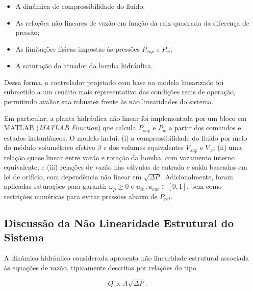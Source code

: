 \begin{itemize}
    \item A dinâmica de compressibilidade do fluido;
    \item As relações não lineares de vazão em função da raiz quadrada da diferença de pressão;
    \item As limitações físicas impostas às pressões $P_{sup}$ e $P_w$;
    \item A saturação do atuador da bomba hidráulica.
\end{itemize}

Dessa forma, o controlador projetado com base no modelo linearizado foi submetido a um cenário mais representativo das condições reais de operação, permitindo avaliar sua robustez frente às não linearidades do sistema.

Em particular, a planta hidráulica não linear foi implementada por um bloco em MATLAB (\textit{MATLAB Function}) que calcula $\dot{P}_{sup}$ e $\dot{P}_w$ a partir dos comandos e estados instantâneos. O modelo inclui: (i) a compressibilidade do fluido por meio do módulo volumétrico efetivo $\beta$ e dos volumes equivalentes $V_{sup}$ e $V_w$; (ii) uma relação quase linear entre vazão e rotação da bomba, com vazamento interno equivalente; e (iii) relações de vazão nas válvulas de entrada e saída baseadas em lei de orifício, com dependência não linear em $\sqrt{\Delta P}$. Adicionalmente, foram aplicadas saturações para garantir $\omega_p \ge 0$ e $u_{in},u_{out} \in [0,1]$, bem como restrições numéricas para evitar pressões abaixo de $P_{ret}$.

\subsection{Discussão da Não Linearidade Estrutural do Sistema}
\label{sec:discussao-nao-linearidade-estrutural}

A dinâmica hidráulica considerada apresenta não linearidade estrutural associada às equações de vazão, tipicamente descritas por relações do tipo

\begin{equation}
Q \propto A \sqrt{\Delta P}.
\end{equation}

